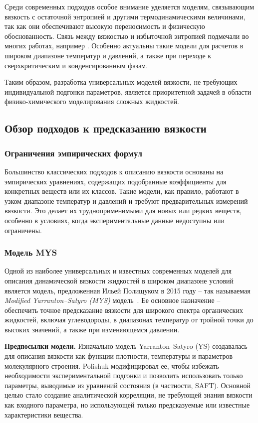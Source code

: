 \documentclass[a4paper,12pt]{article}
\begin{document}
Среди современных подходов особое внимание уделяется моделям, связывающим вязкость с остаточной энтропией и другими термодинамическими величинами, так как они обеспечивают высокую переносимость и физическую обоснованность. Связь между вязкостью и избыточной энтропией подмечали во многих работах, например \cite{taib2020residual}. Особенно актуальны такие модели для расчетов в широком диапазоне температур и давлений, а также при переходе к сверхкритическим и конденсированным фазам.

Таким образом, разработка универсальных моделей вязкости, не требующих индивидуальной подгонки параметров, является приоритетной задачей в области физико-химического моделирования сложных жидкостей.

  \subsection{Обзор подходов к предсказанию вязкости}

    \subsubsection{Ограничения эмпирических формул}
      Большинство классических подходов к описанию вязкости основаны на эмпирических уравнениях, содержащих подобранные коэффициенты для конкретных веществ или их классов. Такие модели, как правило, работают в узком диапазоне температур и давлений и требуют предварительных измерений вязкости. Это делает их трудноприменимыми для новых или редких веществ, особенно в условиях, когда экспериментальные данные недоступны или ограничены. 

    \subsubsection{Модель MYS}

      Одной из наиболее универсальных и известных современных моделей для описания динамической вязкости жидкостей в широком диапазоне условий является модель, предложенная Ильей Полищуком в 2015 году -- так называемая \textit{Modified Yarranton–Satyro (MYS)} модель~\cite{polishuk2015viscosity}. Ее основное назначение -- обеспечить точное предсказание вязкости для широкого спектра органических жидкостей, включая углеводороды, в диапазонах температур от тройной точки до высоких значений, а также при изменяющемся давлении.

      \textbf{Предпосылки модели.}  
      Изначально модель Yarranton–Satyro (YS) создавалась для описания вязкости как функции плотности, температуры и параметров молекулярного строения. Polishuk модифицировал ее, чтобы избежать необходимости экспериментальной подгонки и позволить использовать только параметры, выводимые из уравнений состояния (в частности, SAFT). Основной целью стало создание аналитической корреляции, не требующей знания вязкости как входного параметра, но использующей только предсказуемые или известные характеристики вещества.
      
\end{document}
